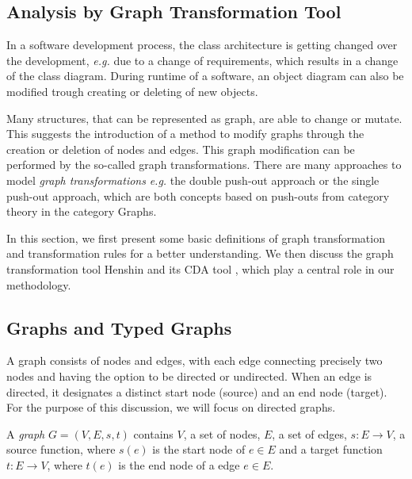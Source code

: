 \subsection{Analysis by Graph Transformation Tool}\label{gts}
In a software development process, the class architecture is getting changed over the development, \emph{e.g.} due to a change of requirements, which results in a change of the class diagram. During runtime of a software, an object diagram can also be modified trough creating or deleting of new objects.

Many structures, that can be represented as graph, are able to change or mutate. This suggests the introduction of a method to modify graphs through the creation or deletion of nodes and edges. This graph modification can be performed by the so-called graph transformations. There are many approaches to model \textit{graph transformations} \emph{e.g.} the double push-out approach or the single push-out approach, which are both concepts based on push-outs from category theory in the category Graphs.

In this section, we first present some basic definitions of graph transformation and transformation rules for a better understanding. We then discuss the graph transformation tool Henshin and its CDA tool \cite{arendt2010henshin}, which play a central role in our methodology.

\subsection*{Graphs and Typed Graphs}
A graph consists of nodes and edges, with each edge connecting precisely two nodes and having the option to be directed or undirected. When an edge is directed, it designates a distinct start node (source) and an end node (target). For the purpose of this discussion, we will focus on directed graphs.

\begin{definition}
\label{def_graph}
A \emph{graph} $G = (V,E,s,t)$ contains $V$, a set of nodes, $E$, a set of edges, $s: E \to V$, a source function, where $s(e)$ is the start node of $e \in E$ and a target function $t:E \to V$, where $t(e)$ is the end node of a edge $e \in E$.
\end{definition}

